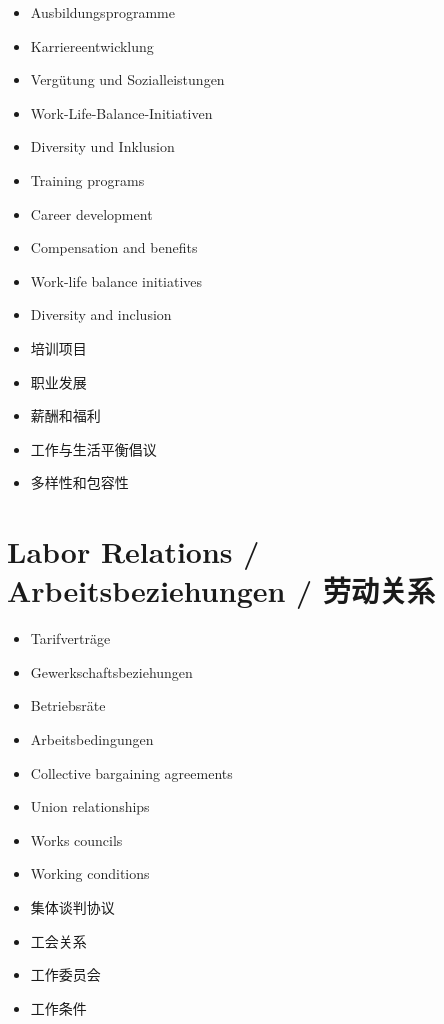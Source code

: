 \begin{otherlanguage}{ngerman}
\begin{itemize}
    \item Ausbildungsprogramme
    \item Karriereentwicklung
    \item Vergütung und Sozialleistungen
    \item Work-Life-Balance-Initiativen
    \item Diversity und Inklusion
\end{itemize}
\end{otherlanguage}

\begin{itemize}
    \item Training programs
    \item Career development
    \item Compensation and benefits
    \item Work-life balance initiatives
    \item Diversity and inclusion
\end{itemize}

\begin{itemize}
    \item 培训项目
    \item 职业发展
    \item 薪酬和福利
    \item 工作与生活平衡倡议
    \item 多样性和包容性
\end{itemize}

\section{Labor Relations / Arbeitsbeziehungen / 劳动关系}

\begin{otherlanguage}{ngerman}
\begin{itemize}
    \item Tarifverträge
    \item Gewerkschaftsbeziehungen
    \item Betriebsräte
    \item Arbeitsbedingungen
\end{itemize}
\end{otherlanguage}

\begin{itemize}
    \item Collective bargaining agreements
    \item Union relationships
    \item Works councils
    \item Working conditions
\end{itemize}

\begin{itemize}
    \item 集体谈判协议
    \item 工会关系
    \item 工作委员会
    \item 工作条件
\end{itemize}
